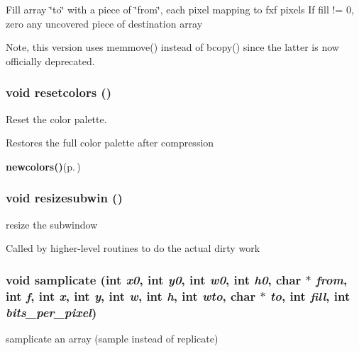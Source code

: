 Fill array \char`\"{}to\char`\"{} with a piece of \char`\"{}from\char`\"{}, each pixel mapping to fxf pixels If fill != 0, zero any uncovered piece of destination array

Note, this version uses memmove() instead of bcopy() since the latter is now officially deprecated. 
\subsubsection{\setlength{\rightskip}{0pt plus 5cm}void resetcolors ()}\label{xtvutils_8c_a200}


Reset the color palette. 

Restores the full color palette after compression

\begin{Desc}
\item[See also:]{\bf newcolors()}{\rm (p.\,\pageref{xtv_8h_a95})} \end{Desc}
\subsubsection{\setlength{\rightskip}{0pt plus 5cm}void resizesubwin ()}\label{xtvutils_8c_a194}


resize the subwindow 

Called by higher-level routines to do the actual dirty work 
\subsubsection{\setlength{\rightskip}{0pt plus 5cm}void samplicate (int {\em x0}, int {\em y0}, int {\em w0}, int {\em h0}, char $\ast$ {\em from}, int {\em f}, int {\em x}, int {\em y}, int {\em w}, int {\em h}, int {\em wto}, char $\ast$ {\em to}, int {\em fill}, int {\em bits\_\-per\_\-pixel})}\label{xtvutils_8c_a226}


samplicate an array (sample instead of replicate) 


